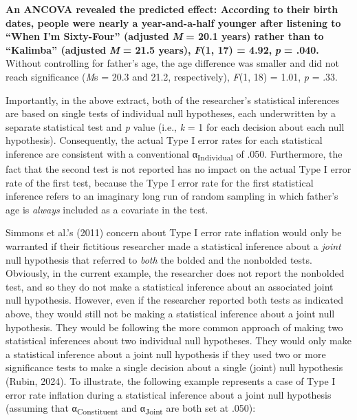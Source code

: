 \documentclass[authordate, empirical]{jote-new-article}
\begin{document}
	\textbf{An ANCOVA revealed the predicted effect: According to their birth dates, people were nearly a year-and-a-half younger after listening to “When I'm Sixty-Four” (adjusted }\emph{\textbf{M}}\textbf{ = 20.1 years) rather than to “Kalimba” (adjusted }\emph{\textbf{M }}\textbf{= 21.5 years), }\emph{\textbf{F}}\textbf{(}\textbf{1, 17) = 4.92, }\emph{\textbf{p}}\textbf{ = .040.} Without controlling for father's age, the age difference was smaller and did not reach significance (\emph{M}s = 20.3 and 21.2, respectively), \emph{F}(1, 18) = 1.01, \emph{p} = .33.



	Importantly, in the above extract, both of the researcher's statistical inferences are based on single tests of individual null hypotheses, each underwritten by a separate statistical test and\emph{ p} value (i.e., \emph{k }= 1 for each decision about each null hypothesis). Consequently, the actual Type I error rates for each statistical inference are consistent with a conventional α\textsubscript{Individual} of .050. Furthermore, the fact that the second test is not reported has no impact on the actual Type I error rate of the first test, because the Type I error rate for the first statistical inference refers to an imaginary long run of random sampling in which father's age is \emph{always} included as a covariate in the test.



	Simmons et al.'s (2011) concern about Type I error rate inflation would only be warranted if their fictitious researcher made a statistical inference about a \emph{joint} null hypothesis that referred to \emph{both} the bolded and the nonbolded tests. Obviously, in the current example, the researcher does not report the nonbolded test, and so they do not make a statistical inference about an associated joint null hypothesis. However, even if the researcher reported both tests as indicated above, they would still not be making a statistical inference about a joint null hypothesis. They would be following the more common approach of making two statistical inferences about two individual null hypotheses. They would only make a statistical inference about a joint null hypothesis if they used two or more significance tests to make a single decision about a single (joint) null hypothesis (Rubin, 2024). To illustrate, the following example represents a case of Type I error rate inflation during a statistical inference about a joint null hypothesis (assuming that α\textsubscript{Constituent} and α\textsubscript{Joint} are both set at .050):
\end{document}
